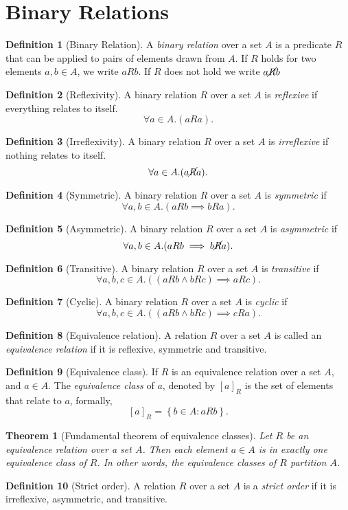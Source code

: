 \documentclass[12pt]{article}
\newtheorem{theorem}{Theorem}[section]
\theoremstyle{definition}
\newtheorem{definition}{Definition}[section]
\begin{document}
\section{Binary Relations}
\begin{definition}[Binary Relation]
    A \emph{binary relation} over a set $A$ is a predicate $R$ that can be applied to pairs of elements drawn from $A$. If $R$ holds for two elements $a, b \in A$, we write $aRb$. If $R$ does not hold we write $a \cancel R  b$
\end{definition}
\begin{definition}[Reflexivity]
    A binary relation $R$ over a set $A$ is \emph{reflexive} if everything relates to itself.
    $$\forall a \in A.(aRa).$$
\end{definition}
\begin{definition}[Irreflexivity]
    A binary relation $R$ over a set $A$ is \emph{irreflexive} if nothing relates to itself.
    $$\forall a \in A.(a\cancel{R}a).$$
\end{definition}
\begin{definition}[Symmetric]
    A binary relation $R$ over a set $A$ is \emph{symmetric} if
    $$\forall a, b\in A.(aRb \implies bRa).$$
\end{definition}
\begin{definition}[Asymmetric]
    A binary relation $R$ over a set $A$ is \emph{asymmetric} if
    $$\forall a, b\in A.(aRb \implies b\cancel{R}a).$$
\end{definition}
\begin{definition}[Transitive]
    A binary relation $R$ over a set $A$ is \emph{transitive} if
    $$\forall a, b,c\in A.((aRb \land b R c) \implies aRc).$$
\end{definition}
\begin{definition}[Cyclic]
    A binary relation $R$ over a set $A$ is \emph{cyclic} if
    $$\forall a, b,c\in A.((aRb \land b R c) \implies cRa).$$
\end{definition}
\begin{definition}[Equivalence relation]
    A relation $R$ over a set $A$ is called an \emph{equivalence relation} if it is reflexive, symmetric and transitive. 
\end{definition}
\begin{definition}[Equivalence class]
    If $R$ is an equivalence relation over a set $A$, and $a \in A$. The \emph{equivalence class} of $a$, denoted by $[a]_R$ is the set of elements that relate to $a$, formally, $$[a]_R = \left\{b \in A : a R b\right\}.$$ 
\end{definition}
\begin{theorem}[Fundamental theorem of equivalence classes]
    Let $R$ be an equivalence relation over a set $A$. Then each element $a \in A$ is in exactly one equivalence class of $R$. In other words, the equivalence classes of $R$ partition $A$.
\end{theorem}
\begin{definition}[Strict order]
    A relation $R$ over a set $A$ is a \emph{strict order} if it is irreflexive, asymmetric, and transitive.
\end{definition}
\end{document}
